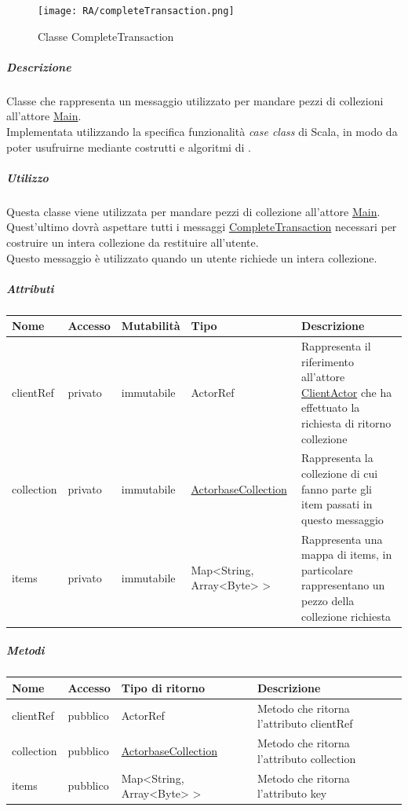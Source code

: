 \documentclass{scalatekids-article}
\begin{document}
\begin{figure}[H]
  \begin{center}
    \texttt{[image: RA/completeTransaction.png]}
    \caption{Classe CompleteTransaction}
  \end{center}
\end{figure}

\subparagraph{Descrizione}
Classe che rappresenta un messaggio utilizzato per mandare pezzi di collezioni
all'attore \hyperref[sec:actorbase::actorsystem::actors::main::Main]{Main}.\\Implementata utilizzando la specifica funzionalità \textit{case class} di Scala,
in modo da poter usufruirne mediante costrutti e algoritmi di
.

\subparagraph{Utilizzo}
Questa classe viene utilizzata per mandare pezzi di collezione all'attore
\hyperref[sec:actorbase::actorsystem::actors::main::Main]{Main}.\\Quest'ultimo
dovrà aspettare tutti i messaggi
\hyperref[sec:actorbase::actorsystem::messages::mainmessages::CompleteTransaction]{CompleteTransaction}
necessari per costruire un intera collezione da restituire all'utente.\\Questo
messaggio è utilizzato quando un utente richiede un intera collezione.

\subparagraph{Attributi}
\begin{tabular}{| p{2cm} | p{1.5cm} | p{2cm} | p{3cm} | p{8.5cm} |}
  \hline
  Nome & Accesso & Mutabilità & Tipo & Descrizione\\
  \hline
  clientRef & privato & immutabile & ActorRef & Rappresenta il riferimento all'attore \hyperref[sec:actorbase::actorsystem::actors::clientactor::ClientActor]{ClientActor} che ha effettuato la richiesta di ritorno collezione\\
  \hline
  collection & privato & immutabile & \hyperref[sec:actorbase::actorsystem::utils::ActorbaseCollection]{ActorbaseCollection} & Rappresenta la collezione di cui fanno parte gli item passati in questo messaggio\\
  \hline
  items & privato & immutabile & Map<String, Array<Byte> > & Rappresenta una mappa di items, in particolare rappresentano un pezzo della collezione richiesta\\
  \hline
\end{tabular}

\subparagraph{Metodi}
\begin{tabular}{| l | l | l | l |}
  \hline
  Nome & Accesso & Tipo di ritorno & Descrizione\\
  \hline
  clientRef & pubblico & ActorRef & Metodo che ritorna l'attributo clientRef\\
  \hline
  collection & pubblico & \hyperref[sec:actorbase::actorsystem::utils::ActorbaseCollection]{ActorbaseCollection} & Metodo che ritorna l'attributo collection\\
  \hline
  items & pubblico & Map<String, Array<Byte> > & Metodo che ritorna l'attributo key\\
  \hline
\end{tabular}
\end{document}
